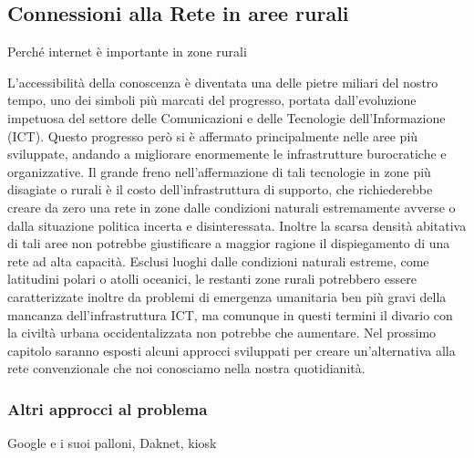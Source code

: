 \documentclass[a4paper]{article}
\begin{document}
		
		\subsection{Connessioni alla Rete in aree rurali}
			{\sc Perché internet è importante in zone rurali}
			
			L'accessibilità della conoscenza è diventata una delle pietre miliari del nostro tempo, uno dei simboli più marcati del progresso, portata dall'evoluzione impetuosa del settore delle Comunicazioni e delle Tecnologie dell'Informazione (ICT). Questo progresso però si è affermato principalmente nelle aree più sviluppate, andando a migliorare enormemente le infrastrutture burocratiche e organizzative. Il grande freno nell'affermazione di tali tecnologie in zone più disagiate o rurali è il costo dell'infrastruttura di supporto, che richiederebbe creare da zero una rete in zone dalle condizioni naturali estremamente avverse o dalla situazione politica incerta e disinteressata. Inoltre la scarsa densità abitativa di tali aree non potrebbe giustificare a maggior ragione il dispiegamento di una rete ad alta capacità. Esclusi  luoghi dalle condizioni naturali estreme, come latitudini polari o atolli oceanici, le restanti zone rurali potrebbero essere caratterizzate inoltre da problemi di emergenza umanitaria ben più gravi della mancanza dell'infrastruttura ICT, ma comunque in questi termini il divario con la civiltà urbana occidentalizzata non potrebbe che aumentare. Nel prossimo capitolo saranno esposti alcuni approcci sviluppati per creare un'alternativa alla rete convenzionale che noi conosciamo nella nostra quotidianità.
			\subsubsection{Altri approcci al problema}
			{\sc Google e i suoi palloni, Daknet, kiosk}
			
\end{document}
